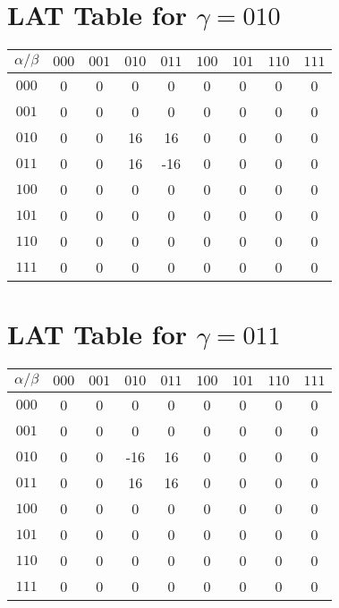 \documentclass{article}
\begin{document}
\section*{LAT Table for $\gamma = 010$}\n\begin{center}
\begin{tabular}{c|cccccccc}
 $ \alpha / \beta $ & $000$ & $001$ & $010$ & $011$ & $100$ & $101$ & $110$ & $111$  \\
\midrule
$000$ & 0 & 0 & 0 & 0 & 0 & 0 & 0 & 0  \\
$001$ & 0 & 0 & 0 & 0 & 0 & 0 & 0 & 0  \\
$010$ & 0 & 0 & 16 & 16 & 0 & 0 & 0 & 0  \\
$011$ & 0 & 0 & 16 & -16 & 0 & 0 & 0 & 0  \\
$100$ & 0 & 0 & 0 & 0 & 0 & 0 & 0 & 0  \\
$101$ & 0 & 0 & 0 & 0 & 0 & 0 & 0 & 0  \\
$110$ & 0 & 0 & 0 & 0 & 0 & 0 & 0 & 0  \\
$111$ & 0 & 0 & 0 & 0 & 0 & 0 & 0 & 0  \\
\end{tabular}
\end{center}

\section*{LAT Table for $\gamma = 011$}\n\begin{center}
\begin{tabular}{c|cccccccc}
 $ \alpha / \beta $ & $000$ & $001$ & $010$ & $011$ & $100$ & $101$ & $110$ & $111$  \\
\midrule
$000$ & 0 & 0 & 0 & 0 & 0 & 0 & 0 & 0  \\
$001$ & 0 & 0 & 0 & 0 & 0 & 0 & 0 & 0  \\
$010$ & 0 & 0 & -16 & 16 & 0 & 0 & 0 & 0  \\
$011$ & 0 & 0 & 16 & 16 & 0 & 0 & 0 & 0  \\
$100$ & 0 & 0 & 0 & 0 & 0 & 0 & 0 & 0  \\
$101$ & 0 & 0 & 0 & 0 & 0 & 0 & 0 & 0  \\
$110$ & 0 & 0 & 0 & 0 & 0 & 0 & 0 & 0  \\
$111$ & 0 & 0 & 0 & 0 & 0 & 0 & 0 & 0  \\
\end{tabular}
\end{center}
\end{document}
